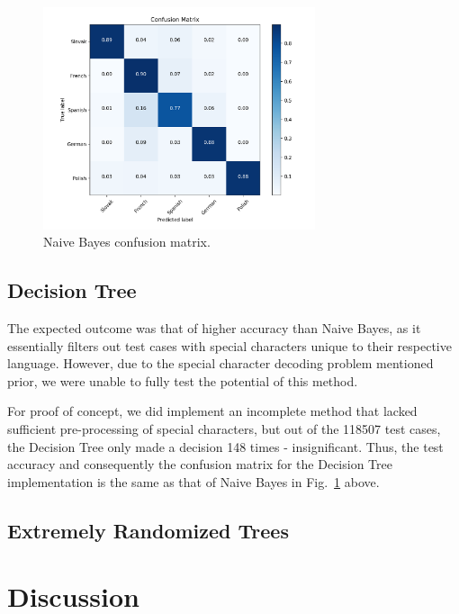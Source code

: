 \documentclass[conference]{IEEEtran}
\begin{document}
\begin{figure}[htbp]
\centering
\includegraphics[width=80mm]{confusion_bayes.png}
\caption{Naive Bayes confusion matrix.}
\label{confusion_bayes}
\end{figure}

\subsection{Decision Tree}
The expected outcome was that of higher accuracy than Naive Bayes, as it essentially filters out test cases with special characters unique to their respective language. However, due to the special character decoding problem mentioned prior, we were unable to fully test the potential of this method.

For proof of concept, we did implement an incomplete method that lacked sufficient pre-processing of special characters, but out of the 118507 test cases, the Decision Tree only made a decision 148 times - insignificant. Thus, the test accuracy and consequently the confusion matrix for the Decision Tree implementation is the same as that of Naive Bayes in Fig.~\ref{confusion_bayes} above.



\subsection{Extremely Randomized Trees}


\section{Discussion}
\end{document}
